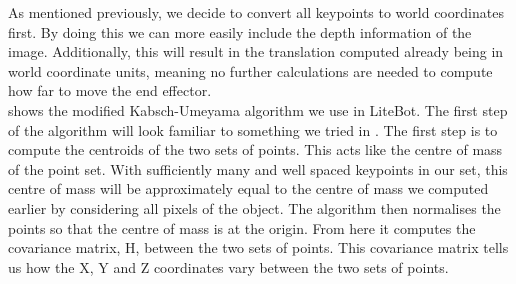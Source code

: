 As mentioned previously, we decide to convert all keypoints to world coordinates first. By doing this we can more easily include the depth information of the image. Additionally, this will result in the translation computed already being in world coordinate units, meaning no further calculations are needed to compute how far to move the end effector.\\

        

 shows the modified Kabsch-Umeyama algorithm we use in LiteBot. The first step of the algorithm will look familiar to something we tried in . The first step is to compute the centroids of the two sets of points. This acts like the centre of mass of the point set. With sufficiently many and well spaced keypoints in our set, this centre of mass will be approximately equal to the centre of mass we computed earlier by considering all pixels of the object. The algorithm then normalises the points so that the centre of mass is at the origin. From here it computes the covariance matrix, H, between the two sets of points. This covariance matrix tells us how the X, Y and Z coordinates vary between the two sets of points.\\

